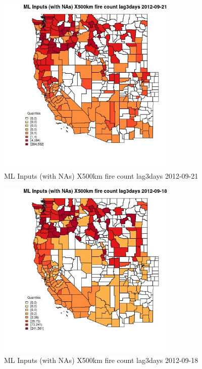 \begin{figure} 
\centering  
\includegraphics[width=0.77\textwidth]{Code_Outputs/Report_ML_input_PM25_Step4_part_e_de_duplicated_aves_compiled_2019-05-14wNAs_CountyX500km_fire_count_lag3daysMean2012-09-21_2012-09-21.jpg} 
\caption{\label{fig:Report_ML_input_PM25_Step4_part_e_de_duplicated_aves_compiled_2019-05-14wNAsCountyX500km_fire_count_lag3daysMean2012-09-21_2012-09-21}ML Inputs (with NAs) X500km fire count lag3days 2012-09-21} 
\end{figure} 
 

\begin{figure} 
\centering  
\includegraphics[width=0.77\textwidth]{Code_Outputs/Report_ML_input_PM25_Step4_part_e_de_duplicated_aves_compiled_2019-05-14wNAs_CountyX500km_fire_count_lag3daysMean2012-09-18_2012-09-18.jpg} 
\caption{\label{fig:Report_ML_input_PM25_Step4_part_e_de_duplicated_aves_compiled_2019-05-14wNAsCountyX500km_fire_count_lag3daysMean2012-09-18_2012-09-18}ML Inputs (with NAs) X500km fire count lag3days 2012-09-18} 
\end{figure} 
 

